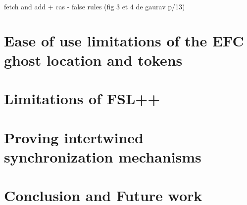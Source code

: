 \documentclass[titlepage,11pt,a4paper]{report}
\theoremstyle{plain}
\begin{document}
fetch and add  + cas - false rules (fig 3 et 4 de gaurav p/13)

\chapter{Ease of use limitations of the EFC ghost location and tokens}



\chapter{Limitations of FSL++}


\chapter{Proving intertwined synchronization mechanisms}




\chapter{Conclusion and Future work}

%
\cleardoublepage
{}
{}



\appendix



\end{document}
